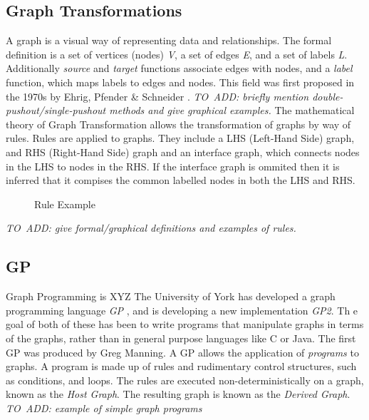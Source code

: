 \documentclass{UoYCSproject}
\begin{document}
\subsection{Graph Transformations}
A graph is a visual way of representing data and relationships. The formal definition is a set of vertices (nodes) \emph{V}, a set of edges \emph{E}, and a set of labels \emph{L}. Additionally \emph{source} and \emph{target} functions associate edges with nodes, and a \emph{label} function, which maps labels to edges and nodes.
This field was first proposed in the 1970s by Ehrig, Pfender \& Schneider \cite{grat_origin}.
\emph{TO~ADD: briefly mention double-pushout/single-pushout methods and give graphical examples.} %
The mathematical theory of Graph Transformation allows the transformation of graphs by way of rules. Rules are applied to graphs. They include a LHS (Left-Hand Side) graph, and RHS (Right-Hand Side) graph and an interface graph, which connects nodes in the LHS to nodes in the RHS. If the interface graph is ommited then it is inferred that it compises the common labelled nodes in both the LHS and RHS. 

\begin{figure}
\caption{Rule Example}
\end{figure}

\emph{TO~ADD: give formal/graphical definitions and examples of rules.}

\subsection{GP}
Graph Programming is XYZ
The University of York has developed a graph programming language \emph{GP} \cite{gp1}, and is developing a new implementation \emph{GP2}. Th e goal of both of these has been to write programs that manipulate graphs in terms of the graphs, rather than in general purpose languages like C or Java. The first GP was produced by Greg Manning. 
A GP allows the application of \emph{programs} to graphs. A program is made up of rules and rudimentary control structures, such as conditions, and loops. The rules are executed non-deterministically on a graph, known as the \emph{Host Graph}. The resulting graph is known as the \emph{Derived Graph}.
\emph{TO~ADD: example of simple graph programs} %
\end{document}
